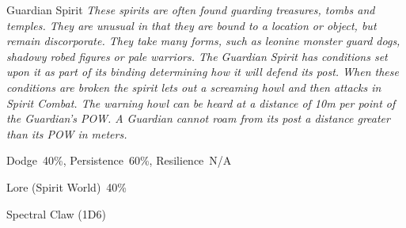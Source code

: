 \begin{samepage}
\begin{monsterbox}{Guardian Spirit}
	\textit{These spirits are often found guarding treasures, tombs and temples. They are unusual in that they are bound to a location or object, but remain discorporate. They take many forms, such as leonine monster guard dogs, shadowy robed figures or pale warriors. The Guardian Spirit has conditions set upon it as part of its binding determining how it will defend its post. When these conditions are broken the spirit lets out a screaming howl and then attacks in Spirit Combat. The warning howl can be heard at a distance of 10m per point of the Guardian’s POW. A Guardian cannot roam from its post a distance greater than its POW in meters.}\\
	\rpghline
	\basics[%
	powerpoints = 17,
	movementrate = 30m,
	plunderrating = (depends on the Treasure being guarded)
	]
	\rpghline%
	\stats[ %
		STR = -,
		CON = -,
		DEX = -,
		SIZ = -,
		INT = 2D6    (7),
		POW = 3D6+6  (17),
		CHA = 3D6    (11)
	]
	\rpghline%
	\begin{rpg-monsteraction}[Resistances]
		Dodge~40\%, Persistence~60\%, Resilience~N/A
	\end{rpg-monsteraction}
	\begin{rpg-monsteraction}[Knowledge]
		Lore (Spirit World)~40\%
	\end{rpg-monsteraction}
	\begin{rpg-monsteraction}
		Spectral Claw (1D6)
	\end{rpg-monsteraction}
\end{monsterbox}
\end{samepage}


